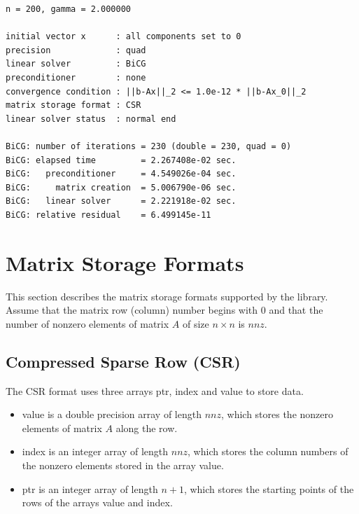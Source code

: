 \documentclass[a4paper]{article}
\begin{document}
\begin{verbatim}
n = 200, gamma = 2.000000

initial vector x      : all components set to 0
precision             : quad
linear solver         : BiCG
preconditioner        : none
convergence condition : ||b-Ax||_2 <= 1.0e-12 * ||b-Ax_0||_2
matrix storage format : CSR
linear solver status  : normal end

BiCG: number of iterations = 230 (double = 230, quad = 0)
BiCG: elapsed time         = 2.267408e-02 sec.
BiCG:   preconditioner     = 4.549026e-04 sec. 
BiCG:     matrix creation  = 5.006790e-06 sec.
BiCG:   linear solver      = 2.221918e-02 sec.
BiCG: relative residual    = 6.499145e-11
\end{verbatim}

\newpage
\section{Matrix Storage Formats}
\label{sec:storages}
This section describes the matrix storage formats supported by the library. 
Assume that the matrix row (column) number begins with $0$ and 
that the number of nonzero elements of matrix $A$ of size $n \times
n$ is $nnz$.

\subsection{Compressed Sparse Row (CSR)}
The CSR format uses three arrays {\ttfamily ptr}, {\ttfamily index} and {\ttfamily value} to store data.
\begin{itemize}
\item {\ttfamily value} is a double precision array of length 
      $nnz$, which stores the nonzero elements of matrix $A$ along the row.
\item {\ttfamily index} is an integer array of length $nnz$,
      which stores the column numbers of the nonzero elements stored in
      the  array {\ttfamily value}.
\item {\ttfamily ptr} is an integer array of length $n+1$, which
      stores the starting points of the rows of the arrays {\ttfamily value} and {\ttfamily index}. 
\end{itemize}
\end{document}
